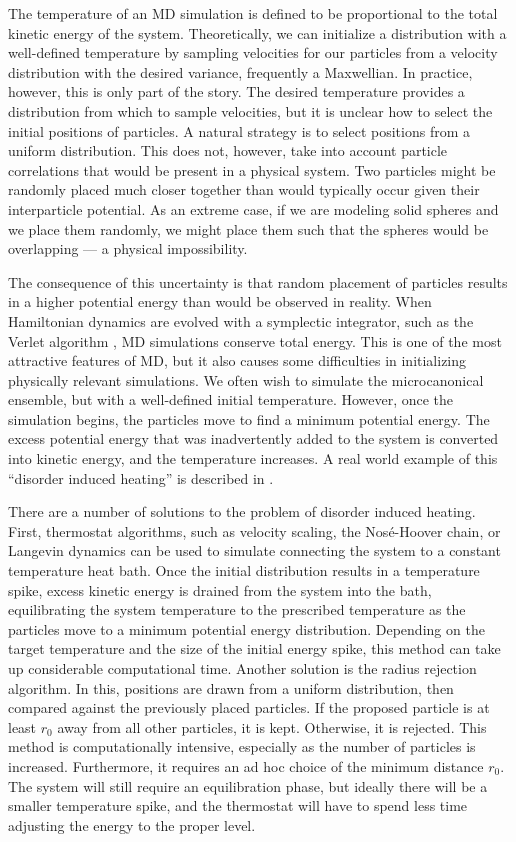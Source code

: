 \documentclass{article}
\begin{document}
The temperature of an MD simulation is defined to be proportional to the total kinetic energy of the system. Theoretically, we can initialize a distribution with a well-defined temperature by sampling velocities for our particles from a velocity distribution with the desired variance, frequently a Maxwellian. In practice, however, this is only part of the story. The desired temperature provides a distribution from which to sample velocities, but it is unclear how to select the initial positions of particles. A natural strategy is to select positions from a uniform distribution. This does not, however, take into account particle correlations that would be present in a physical system. Two particles might be randomly placed much closer together than would typically occur given their interparticle potential. As an extreme case, if we are modeling solid spheres and we place them randomly, we might place them such that the spheres would be overlapping --- a physical impossibility.

The consequence of this uncertainty is that random placement of particles results in a higher potential energy than would be observed in reality. When Hamiltonian dynamics are evolved with a symplectic integrator, such as the Verlet algorithm \cite{verlet1967computer}, MD simulations conserve total energy. This is one of the most attractive features of MD, but it also causes some difficulties in initializing physically relevant simulations. We often wish to simulate the microcanonical ensemble, but with a well-defined initial temperature. However, once the simulation begins, the particles move to find a minimum potential energy. The excess potential energy that was inadvertently added to the system is converted into kinetic energy, and the temperature increases. A real world example of this ``disorder induced heating'' is described in \cite{gericke2003disorder}.

There are a number of solutions to the problem of disorder induced heating. First, thermostat algorithms, such as velocity scaling, the Nos\'e-Hoover chain, or Langevin dynamics can be used to simulate connecting the system to a constant temperature heat bath. Once the initial distribution results in a temperature spike, excess kinetic energy is drained from the system into the bath, equilibrating the system temperature to the prescribed temperature as the particles move to a minimum potential energy distribution. Depending on the target temperature and the size of the initial energy spike, this method can take up considerable computational time. Another solution is the radius rejection algorithm. In this, positions are drawn from a uniform distribution, then compared against the previously placed particles. If the proposed particle is at least $r_0$ away from all other particles, it is kept. Otherwise, it is rejected. This method is computationally intensive, especially as the number of particles is increased. Furthermore, it requires an ad hoc choice of the minimum distance $r_0$.  The system will still require an equilibration phase, but ideally there will be a smaller temperature spike, and the thermostat will have to spend less time adjusting the energy to the proper level.
\end{document}
